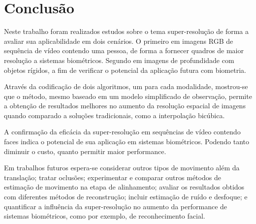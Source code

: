 \chapter{Conclusão}
\label{chap:conclusao}

Neste trabalho foram realizados estudos sobre o tema super-resolução de forma a
avaliar sua aplicabilidade em dois cenários. O primeiro em imagens RGB de
sequência de vídeo contendo uma pessoa, de forma a fornecer quadros de maior
resolução a sistemas biométricos. Segundo em imagens de profundidade com
objetos rígidos, a fim de verificar o potencial da aplicação futura com
biometria.

Através da codificação de dois algoritmos, um para cada modalidade,
mostrou-se que o método, mesmo baseado em um modelo simplificado de observação,
permite a obtenção de resultados melhores no aumento da resolução espacial de
imagens quando comparado a soluções tradicionais, como a interpolação bicúbica.

A confirmação da eficácia da super-resolução em sequências de vídeo contendo
faces indica o potencial de sua aplicação em sistemas biométricos. Podendo
tanto diminuir o custo, quanto permitir maior performance.

Em trabalhos futuros espera-se considerar outros tipos de movimento além da
translação; tratar oclusões; experimentar e comparar outros métodos de
estimação de movimento na etapa de alinhamento; avaliar os resultados obtidos
com diferentes métodos de reconstrução; incluir estimação de ruído e desfoque;
e quantificar a influência da super-resolução no aumento da performance de
sistemas biométricos, como por exemplo, de reconhecimento facial.
